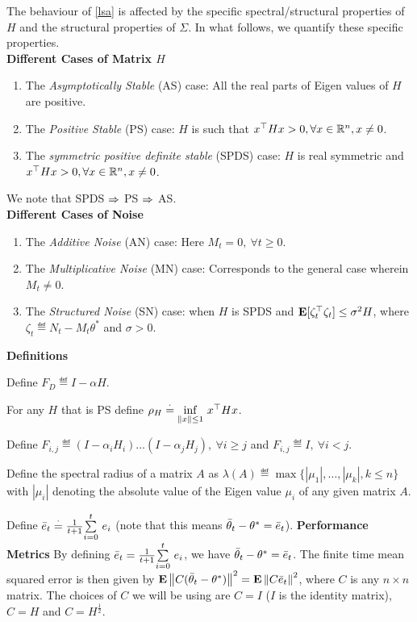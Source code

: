 The behaviour of \eqref{lsa} is affected by the specific spectral/structural properties of $H$ and the structural properties of $\Sigma$.
In what follows, we quantify these specific properties.\\
\textbf{Different Cases of Matrix $H$}
\begin{enumerate}[label=(\roman*)]
\item The \emph{Asymptotically Stable} (AS) case: All the real parts of Eigen values of $H$ are positive.
\item The \emph{Positive Stable} (PS) case: $H$ is such that $x^\top H x>0, \forall x\in \R^n,x\neq 0$.
\item The \emph{symmetric positive definite stable} (SPDS) case: $H$ is real symmetric and $x^\top Hx>0, \forall x\in \R^n, x\neq 0$.
\end{enumerate}
We note that SPDS $\Ra$ PS $\Ra$ AS.\\
\textbf{Different Cases of Noise}
\begin{enumerate}[label=(\roman*)]
\item The \emph{Additive Noise} (AN) case: Here $M_t=0, ~\forall t\geq 0$.
\item The \emph{Multiplicative Noise} (MN) case: Corresponds to the general case wherein $M_t\neq 0$.
\item The \emph{Structured Noise} (SN) case: when $H$ is SPDS and $\E[\zeta_t^\top \zeta_t]\leq \sigma^2 H$, where $\zeta_t\eqdef N_t-M_t\theta^*$ and $\sigma>0$.
\end{enumerate}
\textbf{Definitions}
\ber
\item Define $F_D\eqdef I-\alpha H$.
\item For any $H$ that is PS define $\rho_H \eqdef \us{\inf}{\norm{x}\leq 1 } x^\top H x$.
\item Define $F_{i,j}\eqdef (I-\alpha_i H_i)\ldots (I-\alpha_j H_j),~\forall i\geq j$ and $F_{i,j}\eqdef I,~\forall i<j$.
\item Define the spectral radius of a matrix $A$ as $\lambda(A) \eqdef \max\{|\mu_1|,\ldots,|\mu_k|,k\leq n\}$ with $|\mu_i|$ denoting the absolute value of the Eigen value $\mu_i$ of any given matrix $A$.
\item Define $\eb_t\eqdef\frac{1}{t+1}\ous{\sum}{i=0}{t} e_i$ (note that this means $\tb_t-\ts=\eb_t$).
\eer
\textbf{Performance Metrics} By defining $\eb_t=\frac{1}{t+1}\ous{\sum}{i=0}{t} e_i$, we have $\tb_t-\ts=\eb_t$. The finite time mean squared error is then given by $\E\norm{C(\tb_t-\ts)}^2=\E\norm{C\eb_t}^2$, where $C$ is any $n\times n$ matrix. The choices of $C$ we will be using are $C=I$ ($I$ is the identity matrix), $C=H$ and $C=H^{\frac{1}{2}}$.\par


